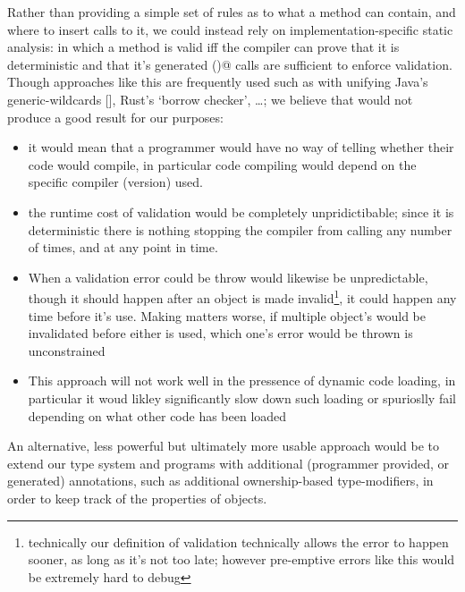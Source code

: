 Rather than providing a simple set of rules as to what a \Q@validate@ method can contain, and where to insert calls to it, we could instead rely on implementation-specific static analysis: in which a \Q@validate@ method is valid iff the compiler can prove that it is deterministic and that it’s generated \Q@validate()@ calls are sufficient to enforce validation. Though approaches like this are frequently used such as with unifying Java’s generic-wildcards [], Rust’s ‘borrow checker’, …; we believe that would not produce a good result for our purposes: 
\begin{itemize}
	\item it would mean that a programmer would have no way of telling whether their code would compile, in particular code compiling would depend on the specific compiler (version) used.
	\item the runtime cost of validation would be completely unpridictibable; since it is deterministic there is nothing stopping the compiler from calling \Q@validate@ any number of times, and at any point in time.
	\item When a validation error could be throw would likewise be unpredictable, though it should happen after an object is made invalid\footnote{technically our definition of validation technically allows the error to happen sooner, as long as it’s not too late; however pre-emptive errors like this would be extremely hard to debug}, it could happen any time before it’s use. Making matters worse, if multiple object’s would be invalidated before either is used, which one’s error would be thrown is unconstrained
	\item This approach will not work well in the pressence of dynamic code loading, in particular it woud likley significantly slow down such loading or spurioslly fail depending on what other code has been loaded
\end{itemize}


An alternative, less powerful but ultimately more usable approach would be to extend our type system and programs with additional (programmer provided, or generated) annotations, such as additional ownership-based type-modifiers, in order to keep track of the properties of objects.